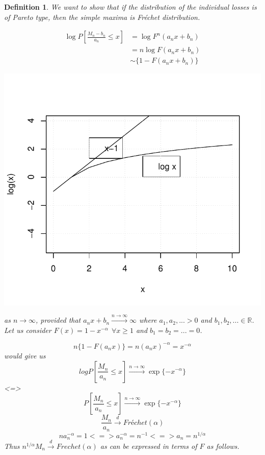 \documentclass[11pt,a4paper,oneside]{article}\usepackage[]{graphicx}\usepackage[]{color}
\makeatletter
\def\maxwidth{ %
  \ifdim\Gin@nat@width>\linewidth
    \linewidth
  \else
    \Gin@nat@width
  \fi
}
\newenvironment{knitrout}{}{} %
\newtheorem{defi}[subsection]{Definition}
\makeatother
\begin{document}
\begin{algin*}
\begin{defi}
We want to show that if the distribution of the individual losses is of Pareto type, then the simple maxima is Fréchet distribution.

\begin{align*}
\log P\left[\frac{M_n-b_n}{a_n}\leq x\right] &= \log F^n(a_nx+b_n)\\
&=n\log F(a_nx+b_n)\\
&\sim\{1-F(a_nx+b_n)\}
\end{align*}

\begin{knitrout}
\color{fgcolor}

{\centering \includegraphics[width=\maxwidth]{figure/plot1-1} 

}



\end{knitrout}

as $n\rightarrow \infty$, provided that $a_nx+b_n\xrightarrow{n\rightarrow\infty}\infty$ where
$a_1,a_2,...>0$ and $b_1,b_2,...\in\mathbb{R}$. Let us consider $F(x)=1-x^{-\alpha}\ \ \forall x \geq 1$ and $b_1=b_2=...=0$.

$$n\{1-F(a_nx)\}=n(a_nx)^{-\alpha}=x^{-\alpha}$$
would give us 
$$log P[\frac{M_n}{a_n}\leq x]\xrightarrow{n\rightarrow\infty}\exp\{-x^{-\alpha}\}$$
<=>
$$P[\frac{M_n}{a_n}\leq x]\xrightarrow{n\rightarrow\infty}\exp\{-x^{-\alpha}\}$$
$$\frac{M_n}{a_n}\xrightarrow{d} Fréchet(\alpha)$$
$$na_n^{-\alpha}=1<=>a_n^{-\alpha}=n^{-1}<=>a_n=n^{1/\alpha}$$
Thus $n^{1/\alpha}M_n\xrightarrow{d}Frechet(\alpha)$ as  can be expressed in terms of $F$ as follows.


\end{defi}
\end{algin*}
\end{document}
